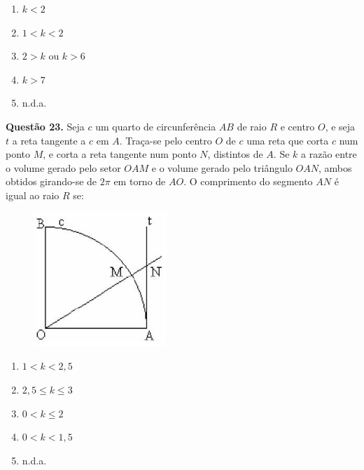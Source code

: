 \documentclass[11pt]{article}
\begin{document}
\begin{multicols}{3}
\begin{enumerate}[\bf A (\quad)]
    \item $k < 2$
    \item $1 < k < 2$
    \item $2 > k$ ou $k > 6$
    \item $k > 7$
    \item n.d.a.
\end{enumerate}
\end{multicols}

\newpage

\textbf{Questão 23.} Seja  $c$  um  quarto  de  circunferência  $AB$  de  raio  $R$  e  centro $O$, e seja $t$ a reta tangente a $c$ em $A$. Traça-se pelo centro $O$ de $c$ uma reta que corta $c$ num ponto $M$, e corta a reta  tangente  num  ponto  $N$,  distintos  de  $A$.  Se  $k$  a  razão  entre  o  volume  gerado  pelo  setor  $OAM$  e  o  volume  gerado pelo triângulo $OAN$, ambos obtidos girando-se de $2\pi$  em torno de $AO$. O comprimento do segmento $AN$ é igual ao raio $R$ se:

\begin{figure}[h]

\centering %
\includegraphics[width=5cm]{imgs/q23.jpg} %
\end{figure}

\begin{multicols}{3}
    \begin{enumerate}[\bf A (\quad)]
        \item $1 < k < 2,5$
        \item $2,5 \leq k \leq 3 $
        \item $0 < k \leq 2$
        \item $0 < k < 1,5$
        \item n.d.a.
    \end{enumerate}
\end{multicols}
\end{document}
